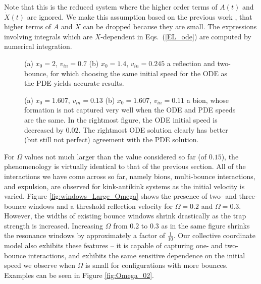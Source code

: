 \documentclass[vecphys]{svmult}		%
\begin{document}
{Note that this is the reduced system where the higher order
  terms of $A(t)$ and $\dot{X}(t)$ are ignored. We make this assumption  based on the previous work \cite{sugiyama}, that higher terms of $A$ and $\dot{X}$ can be dropped because they are small. The expressions involving integrals which are $X$-dependent in Eqs.~(\ref{EL_ode}) are computed by numerical integration. 





\begin{figure}[tbp]
\begin{center}
  \end{center}
   \caption{(a) $x_0=2$, $v_{in}=0.7$ (b) $x_0=1.4$, $v_{in}=0.245$ a reflection and two-bounce, for which choosing the same initial speed for the ODE as the PDE yields accurate results.}
    \label{one-two}
\end{figure}

\begin{figure}[tbp]
\begin{center}
      \subfigure[]{{\texttt{[image: x0\_1607\_013]}}}
      \subfigure[]{{\texttt{[image: x0\_1607\_v\_011]}}}
  \end{center}
   \caption{(a) $x_0=1.607$, $v_{in}=0.13$ (b) $x_0=1.607$, $v_{in}=0.11$ a bion, whose formation is not captured very well when the ODE and PDE speeds are the same. In the rightmost figure, the ODE initial speed is decreased by $0.02$. The rightmost ODE solution clearly has better (but still not perfect) agreement with the PDE solution.}
    \label{extra}
\end{figure}

For $\Omega$ values not much larger than the value considered
so far (of $0.15$), the phenomenology is virtually identical to that of the
previous section. All of the interactions we have come across so far,
namely bions, multi-bounce interactions, and expulsion, are observed
for kink-antikink systems as the initial velocity is varied.
Figure \ref{fig:windows_Large_Omega} shows the presence of two- and
three-bounce windows and a threshold reflection velocity for $\Omega=0.2$
and $\Omega=0.3$. However, the widths of existing bounce windows shrink
drastically as the trap strength is increased. Increasing
$\Omega$ from $0.2$ to $0.3$ as in the same figure shrinks the resonance windows by approximately a factor of $\frac{1}{10}$.
Our collective coordinate model also exhibits these features --
it is capable of capturing one- and two-bounce interactions,
and exhibits the same sensitive dependence on the initial speed
we observe when $\Omega$ is small for configurations with more bounces. Examples can be seen in Figure \ref{fig:Omega_02}.

}
\end{document}
